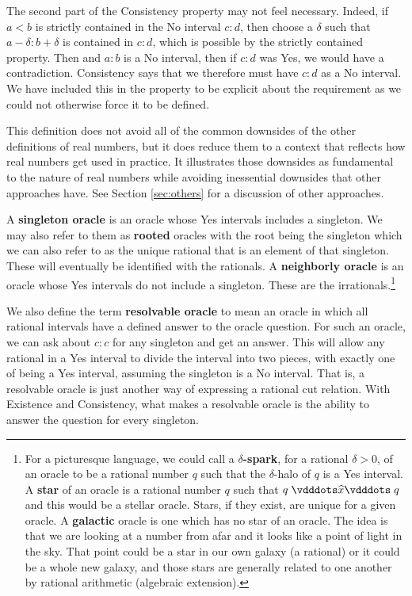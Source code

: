 \documentclass[12pt]{article}
\begin{document}
\begin{enumerate}
    The second part of the Consistency property may not feel necessary. Indeed, if $a\lt b$ is strictly contained in the No interval $c:d$, then choose a $\delta$ such that $a- \delta : b+\delta$ is contained in $c:d$, which is possible by the strictly contained property. Then  and $a:b$ is a No interval, then if $c:d$ was Yes, we would have a contradiction. Consistency says that we therefore must have $c:d$ as a No interval. We have included this in the property to be explicit about the requirement as we could not otherwise force it to be defined. 
    

\end{enumerate}


This definition does not avoid all of the common downsides of the other definitions of real numbers, but it does reduce them to a context that reflects how real numbers get used in practice. It illustrates those downsides as fundamental to the nature of real numbers while avoiding inessential downsides that other approaches have. See Section \ref{sec:others} for a discussion of other approaches.  


A \textbf{singleton oracle }is an oracle whose Yes intervals includes a singleton. We may also refer to them as \textbf{rooted} oracles with the root being the singleton which we can also refer to as the unique rational that is an element of that singleton. These will eventually be identified with the rationals. A \textbf{neighborly oracle} is an oracle whose Yes intervals do not include a singleton. These are the irrationals.\footnote{For a picturesque language, we could call a \textbf{$\delta$-spark}, for a rational $\delta > 0$, of an oracle to be a rational number $q$ such that the $\delta$-halo of $q$ is a Yes interval. A \textbf{star} of an oracle is a rational number $q$ such that $q \xora q$ and this would be a stellar oracle. Stars, if they exist, are unique for a given oracle. A \textbf{galactic} oracle is one which has no star of an oracle. The idea is that we are looking at a number from afar and it looks like a point of light in the sky. That point could be a star in our own galaxy (a rational) or it could be a whole new galaxy, and those stars are generally related to one another by rational arithmetic (algebraic extension).}

We also define the term \textbf{resolvable oracle} to mean an oracle in which all rational intervals have a defined answer to the oracle question. For such an oracle, we can ask about $c:c$ for any singleton and get an answer. This will allow any rational in a Yes interval to divide the interval into two pieces, with exactly one of being a Yes interval, assuming the singleton is a No interval. That is, a resolvable oracle is just another way of expressing a rational cut relation. With Existence and Consistency, what makes a resolvable oracle is the ability to answer the question for every singleton. 
\end{document}
